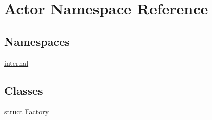 \hypertarget{namespace_actor}{}\section{Actor Namespace Reference}
\label{namespace_actor}
\subsection*{Namespaces}
\begin{DoxyCompactItemize}
\item 
 \mbox{\hyperlink{namespace_actor_1_1internal}{internal}}
\end{DoxyCompactItemize}
\subsection*{Classes}
\begin{DoxyCompactItemize}
\item 
struct \mbox{\hyperlink{struct_actor_1_1_factory}{Factory}}
\end{DoxyCompactItemize}
